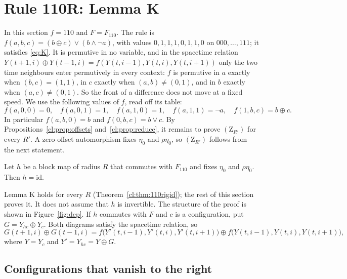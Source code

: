\section{Rule 110R: Lemma K}\label{cl:sec:110}

In this section $f=110$ and $F=F_{110}$. The rule is $f(a,b,c)=(b\oplus c)\vee(b\wedge\neg a)$, with values $0,1,1,1,0,1,1,0$ on $000,\dots,111$; it satisfies \eqref{eq:K}. It is permutive in no variable, and in the spacetime relation $Y(t+1,i)\oplus Y(t-1,i)=f(Y(t,i-1),Y(t,i),Y(t,i+1))$ only the two time neighbours enter permutively in every context: $f$ is permutive in $a$ exactly when $(b,c)=(1,1)$, in $c$ exactly when $(a,b)\ne(0,1)$, and in $b$ exactly when $(a,c)\ne(0,1)$. So the front of a difference does not move at a fixed speed. We use the following values of $f$, read off its table:
\[
f(a,0,0)=0,\quad f(a,0,1)=1,\quad f(a,1,0)=1,\quad f(a,1,1)=\neg a,\quad f(1,b,c)=b\oplus c.
\]
In particular $f(a,b,0)=b$ and $f(0,b,c)=b\vee c$. By Propositions~\ref{cl:prop:offsets} and~\ref{cl:prop:reduce}, it remains to prove $(\mathrm Z_{R'})$ for every $R'$. A zero-offset automorphism fixes $\eta_0$ and $\rho\eta_0$, so $(\mathrm Z_{R'})$ follows from the next statement.

\begin{lemmaK}
Let $h$ be a block map of radius $R$ that commutes with $F_{110}$ and fixes $\eta_0$ and $\rho\eta_0$. Then $h=\mathrm{id}$.
\end{lemmaK}

Lemma K holds for every $R$ (Theorem~\ref{cl:thm:110rigid}); the rest of this section proves it. It does not assume that $h$ is invertible. The structure of the proof is shown in Figure~\ref{fig:dep}. If $h$ commutes with $F$ and $c$ is a configuration, put $G=Y_{hc}\oplus Y_c$. Both diagrams satisfy the spacetime relation, so
\begin{equation}\label{cl:eq:G}
G(t+1,i)\oplus G(t-1,i)=f\bigl(Y'(t,i-1),Y'(t,i),Y'(t,i+1)\bigr)\oplus f\bigl(Y(t,i-1),Y(t,i),Y(t,i+1)\bigr),
\end{equation}
where $Y=Y_c$ and $Y'=Y_{hc}=Y\oplus G$.



\subsection{Configurations that vanish to the right}\label{cl:sec:tail}

